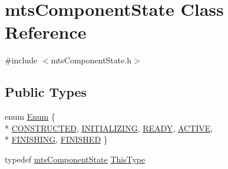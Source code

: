\hypertarget{classmts_component_state}{\section{mts\-Component\-State Class Reference}
\label{classmts_component_state}
}


{\ttfamily \#include $<$mts\-Component\-State.\-h$>$}

\subsection*{Public Types}
\begin{DoxyCompactItemize}
\item 
enum \hyperlink{classmts_component_state_a1158e4d2d79fff671354909e87f58928}{Enum} \{ \\*
\hyperlink{classmts_component_state_a1158e4d2d79fff671354909e87f58928acdca8190c67699a7982a3aefeefdac8e}{C\-O\-N\-S\-T\-R\-U\-C\-T\-E\-D}, 
\hyperlink{classmts_component_state_a1158e4d2d79fff671354909e87f58928a925e36faf39bd9ddc078621acb0d523c}{I\-N\-I\-T\-I\-A\-L\-I\-Z\-I\-N\-G}, 
\hyperlink{classmts_component_state_a1158e4d2d79fff671354909e87f58928a61548ba4ca876461d9bc7e6fef7b54a4}{R\-E\-A\-D\-Y}, 
\hyperlink{classmts_component_state_a1158e4d2d79fff671354909e87f58928a74c0603108e70255b42ec0eb1dd68931}{A\-C\-T\-I\-V\-E}, 
\\*
\hyperlink{classmts_component_state_a1158e4d2d79fff671354909e87f58928a9aa5dd15f4127016cec353e5afbcc592}{F\-I\-N\-I\-S\-H\-I\-N\-G}, 
\hyperlink{classmts_component_state_a1158e4d2d79fff671354909e87f58928a921eb9bc0ddc6cc0be548ad38471ab5d}{F\-I\-N\-I\-S\-H\-E\-D}
 \}
\item 
typedef \hyperlink{classmts_component_state}{mts\-Component\-State} \hyperlink{classmts_component_state_a668efaf1bf3c84a5448587f04d7312b5}{This\-Type}
\end{DoxyCompactItemize}
